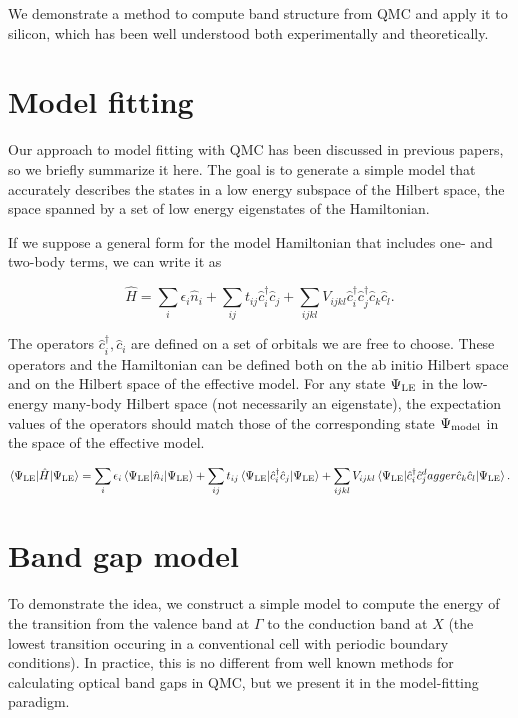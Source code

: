 We demonstrate a method to compute band structure from QMC and apply it to silicon, which has been well understood both experimentally and theoretically.

\section{Model fitting}

Our approach to model fitting with QMC has been discussed in previous papers, so we briefly summarize it here.
The goal is to generate a simple model that accurately describes the states in a low energy subspace of the Hilbert space, the space spanned by a set of low energy eigenstates of the Hamiltonian.

If we suppose a general form for the model Hamiltonian that includes one- and two-body terms, we can write it as

\begin{equation}
\hat{H} = \sum_i \epsilon_i \hat{n}_i + \sum_{ij} t_{ij} \hat{c}_i^\dagger \hat{c}_j + \sum_{ijkl} V_{ijkl} \hat{c}_i^\dagger \hat{c}_j^\dagger \hat{c}_k \hat{c}_l.
\end{equation}

The operators $\hat{c}_i^\dagger, \hat{c}_i$ are defined on a set of orbitals we are free to choose.
These operators and the Hamiltonian can be defined both on the ab initio Hilbert space and on the Hilbert space of the effective model.
For any state $\Psi_{\rm LE}$ in the low-energy many-body Hilbert space (not necessarily an eigenstate), the expectation values of the operators should match those of the corresponding state $\Psi_{\rm model}$ in the space of the effective model.

\begin{equation}
\braket{\Psi_{\rm LE} | \hat{H} | \Psi_{\rm LE}} = 
\sum_i \epsilon_i \braket{\Psi_{\rm LE} | \hat{n}_i | \Psi_{\rm LE}} + 
\sum_{ij} t_{ij} \braket{\Psi_{\rm LE} | \hat{c}_i^\dagger \hat{c}_j | \Psi_{\rm LE}} + 
\sum_{ijkl} V_{ijkl} \braket{ \Psi_{\rm LE} | \hat{c}_i^\dagger \hat{c}_j^dagger \hat{c}_k \hat{c}_l | \Psi_{\rm LE}}.
\end{equation}



\section{Band gap model}

To demonstrate the idea, we construct a simple model to compute the energy of the transition from the valence band at $\Gamma$ to the conduction band at $X$ (the lowest transition occuring in a conventional cell with periodic boundary conditions).
In practice, this is no different from well known methods for calculating optical band gaps in QMC, but we present it in the model-fitting paradigm.

